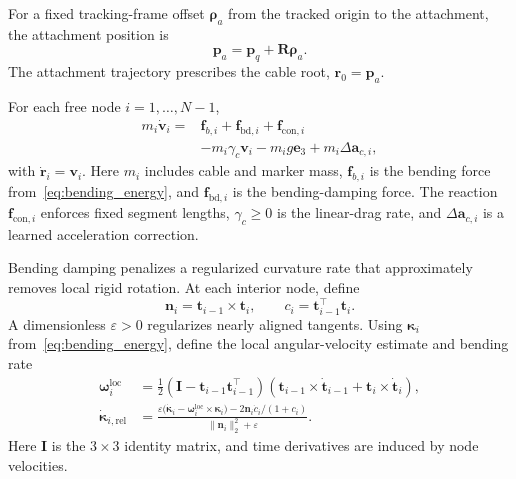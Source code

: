 \documentclass[letterpaper, 10 pt, conference]{ieeeconf}
\begin{document}
For a fixed tracking-frame offset $\boldsymbol\rho_a$
from the tracked origin to the attachment, the attachment
position is
\begin{equation}
\mathbf p_a=\mathbf p_q+\mathbf R\boldsymbol\rho_a.
\label{eq:attachment_mapping}
\end{equation}
The attachment trajectory prescribes the cable root,
$\mathbf r_0=\mathbf p_a$.

For each free node $i=1,\ldots,N-1$,
\begin{equation}
\begin{aligned}
m_i\dot{\mathbf v}_i
={}&\mathbf f_{b,i}
   +\mathbf f_{\mathrm{bd},i}
   +\mathbf f_{\mathrm{con},i}\\
&-m_i\gamma_c\mathbf v_i
 -m_i g\mathbf e_3
 +m_i\Delta\mathbf a_{c,i},
\end{aligned}
\label{eq:driven_cable_dynamics}
\end{equation}
with $\dot{\mathbf r}_i=\mathbf v_i$.
Here $m_i$ includes cable and marker mass,
$\mathbf f_{b,i}$ is the bending force from~\eqref{eq:bending_energy}, and
$\mathbf f_{\mathrm{bd},i}$ is the bending-damping force.
The reaction $\mathbf f_{\mathrm{con},i}$ enforces fixed
segment lengths, $\gamma_c\geq0$ is the linear-drag rate,
and $\Delta\mathbf a_{c,i}$ is a learned acceleration correction.

Bending damping penalizes a regularized curvature rate that
approximately removes local rigid rotation. At each interior
node, define
\[
\mathbf n_i=\mathbf t_{i-1}\times\mathbf t_i,
\qquad
c_i=\mathbf t_{i-1}^\top\mathbf t_i.
\]
A dimensionless $\varepsilon>0$ regularizes nearly aligned tangents.
Using $\boldsymbol\kappa_i$ from~\eqref{eq:bending_energy},
define the local angular-velocity estimate and bending rate
\begin{equation}
\begin{aligned}
\boldsymbol\omega_i^{\mathrm{loc}}
&=\tfrac12(\mathbf I-\mathbf t_{i-1}\mathbf t_{i-1}^\top)
(\mathbf t_{i-1}\times\dot{\mathbf t}_{i-1}
+\mathbf t_i\times\dot{\mathbf t}_i),\\
\dot{\boldsymbol\kappa}_{i,\mathrm{rel}}
&=\frac{\varepsilon\bigl(\dot{\boldsymbol\kappa}_i
-\boldsymbol\omega_i^{\mathrm{loc}}\times\boldsymbol\kappa_i\bigr)
-2\mathbf n_i\dot c_i/(1+c_i)}
{\|\mathbf n_i\|_2^2+\varepsilon}.
\end{aligned}
\label{eq:regularized_bending_rate}
\end{equation}
Here $\mathbf I$ is the $3\times3$ identity matrix, and time
derivatives are induced by node velocities.
\end{document}

